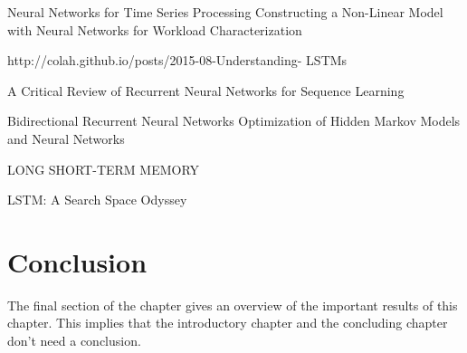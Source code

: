 Neural Networks for Time Series Processing
Constructing a Non-Linear Model with Neural
Networks for Workload Characterization



http://colah.github.io/posts/2015-08-Understanding-
LSTMs

A Critical Review of Recurrent Neural Networks
for Sequence Learning

Bidirectional Recurrent Neural Networks
Optimization of Hidden Markov Models and Neural
Networks


LONG SHORT-TERM MEMORY

LSTM: A Search Space Odyssey

\section{Conclusion}
The final section of the chapter gives an overview of the important results
of this chapter. This implies that the introductory chapter and the
concluding chapter don't need a conclusion.



